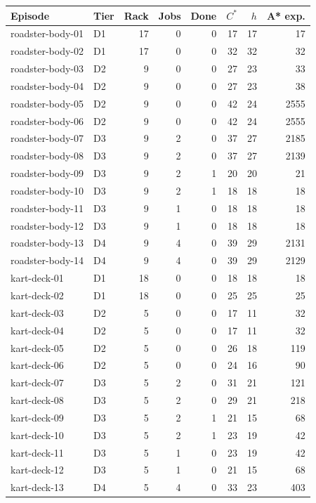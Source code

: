 \begin{longtable}{llrrrrrr}
\toprule Episode & Tier & Rack & Jobs & Done & $C^*$ & $h$ & A* exp.\\\midrule\endhead
roadster-body-01 & D1 & 17 & 0 & 0 & 17 & 17 & 17\\
roadster-body-02 & D1 & 17 & 0 & 0 & 32 & 32 & 32\\
roadster-body-03 & D2 & 9 & 0 & 0 & 27 & 23 & 33\\
roadster-body-04 & D2 & 9 & 0 & 0 & 27 & 23 & 38\\
roadster-body-05 & D2 & 9 & 0 & 0 & 42 & 24 & 2555\\
roadster-body-06 & D2 & 9 & 0 & 0 & 42 & 24 & 2555\\
roadster-body-07 & D3 & 9 & 2 & 0 & 37 & 27 & 2185\\
roadster-body-08 & D3 & 9 & 2 & 0 & 37 & 27 & 2139\\
roadster-body-09 & D3 & 9 & 2 & 1 & 20 & 20 & 21\\
roadster-body-10 & D3 & 9 & 2 & 1 & 18 & 18 & 18\\
roadster-body-11 & D3 & 9 & 1 & 0 & 18 & 18 & 18\\
roadster-body-12 & D3 & 9 & 1 & 0 & 18 & 18 & 18\\
roadster-body-13 & D4 & 9 & 4 & 0 & 39 & 29 & 2131\\
roadster-body-14 & D4 & 9 & 4 & 0 & 39 & 29 & 2129\\
kart-deck-01 & D1 & 18 & 0 & 0 & 18 & 18 & 18\\
kart-deck-02 & D1 & 18 & 0 & 0 & 25 & 25 & 25\\
kart-deck-03 & D2 & 5 & 0 & 0 & 17 & 11 & 32\\
kart-deck-04 & D2 & 5 & 0 & 0 & 17 & 11 & 32\\
kart-deck-05 & D2 & 5 & 0 & 0 & 26 & 18 & 119\\
kart-deck-06 & D2 & 5 & 0 & 0 & 24 & 16 & 90\\
kart-deck-07 & D3 & 5 & 2 & 0 & 31 & 21 & 121\\
kart-deck-08 & D3 & 5 & 2 & 0 & 29 & 21 & 218\\
kart-deck-09 & D3 & 5 & 2 & 1 & 21 & 15 & 68\\
kart-deck-10 & D3 & 5 & 2 & 1 & 23 & 19 & 42\\
kart-deck-11 & D3 & 5 & 1 & 0 & 23 & 19 & 42\\
kart-deck-12 & D3 & 5 & 1 & 0 & 21 & 15 & 68\\
kart-deck-13 & D4 & 5 & 4 & 0 & 33 & 23 & 403\\

\end{longtable}
